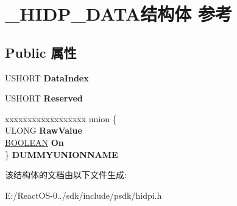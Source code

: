 \hypertarget{struct___h_i_d_p___d_a_t_a}{}\section{\+\_\+\+H\+I\+D\+P\+\_\+\+D\+A\+T\+A结构体 参考}
\label{struct___h_i_d_p___d_a_t_a}
\subsection*{Public 属性}
\begin{DoxyCompactItemize}
\item 
\mbox{\label{struct___h_i_d_p___d_a_t_a_accbfa533f39d8eb8f402836ac933407a}} 
U\+S\+H\+O\+RT {\bfseries Data\+Index}
\item 
\mbox{\label{struct___h_i_d_p___d_a_t_a_af17012629db702acdf5ff1476ffb2759}} 
U\+S\+H\+O\+RT {\bfseries Reserved}
\item 
\mbox{\label{struct___h_i_d_p___d_a_t_a_a29ce26bd4bee21c45ad86090d52e1e6b}} 
\begin{tabbing}
xx\=xx\=xx\=xx\=xx\=xx\=xx\=xx\=xx\=\kill
union \{\\
\>ULONG {\bfseries RawValue}\\
\>\hyperlink{_processor_bind_8h_a112e3146cb38b6ee95e64d85842e380a}{BOOLEAN} {\bfseries On}\\
\} {\bfseries DUMMYUNIONNAME}\\

\end{tabbing}\end{DoxyCompactItemize}


该结构体的文档由以下文件生成\+:\begin{DoxyCompactItemize}
\item 
E\+:/\+React\+O\+S-\/0../sdk/include/psdk/hidpi.\+h\end{DoxyCompactItemize}
